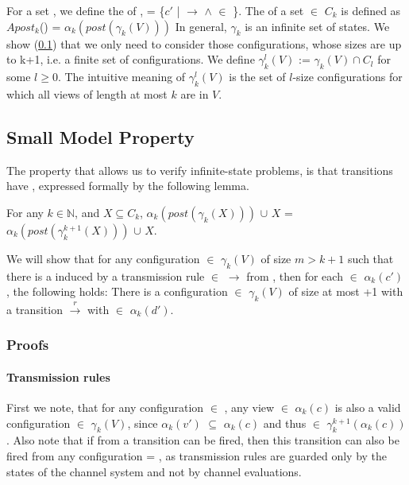 For a set , we define the  of ,  = \{$c'$ |  $\rightarrow$  $\wedge$  $\in$ \}. The  of a set  $\in$ $C_k$ is defined as $Apost_k$() = $\alpha_k(post(\gamma_k(V)))$ In general, $\gamma_k$ is an infinite set of states. We show (\ref{proof}) that we only need to consider those configurations, whose sizes are up to k+1, i.e. a finite set of configurations. We define $\gamma_k^l(V)$ := $\gamma_k(V) \cap C_l$ for some $l\geq 0$. The intuitive meaning of $\gamma_k^l(V)$ is the set of $l$-size configurations for which all views of length at most $k$ are in $V$.

\subsection{Small Model Property}
\label{proof}
The property that allows us to verify infinite-state problems, is that transitions have , expressed formally by the following lemma. 

\begin{lemma}
\label{lemma1}
For any $k\in\mathbb{N}$, and $X\subseteq C_k$, $\alpha_k(post(\gamma_k(X)))$ $\cup$ $X$ = $\alpha_k(post(\gamma_k^{k+1}(X)))$ $\cup$ $X$.
\end{lemma}



We will show that for any configuration  $\in$ $\gamma_k(V)$ of size $m > k + 1$ such that there is a  induced by a transmission rule  $\in$ $\rightarrow$ from , then for each  $\in$ $\alpha_k(c')$, the following holds: There is a configuration  $\in$ $\gamma_k(V)$ of size at most +1 with a transition  $\xrightarrow{r}$  with  $\in$ $\alpha_k(d')$. 

\subsubsection{Proofs}

\paragraph{Transmission rules}
\label{proofTransmission}
First we note, that for any configuration  $\in$ , any view  $\in$ $\alpha_k(c)$ is also a valid configuration  $\in$ $\gamma_k(V)$, since $\alpha_k(v')$ $\subseteq$ $\alpha_k(c)$ and thus  $\in$ $\gamma_k^{k+1}(\alpha_k(c))$. Also note that if from  a transition  can be fired, then this transition can also be fired from any configuration  = , as transmission rules are guarded only by the states of the channel system and not by channel evaluations.

